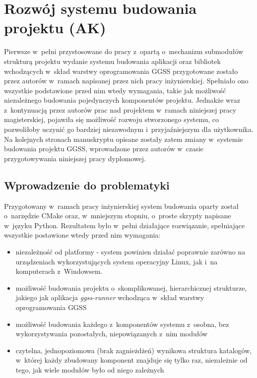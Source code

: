 \clearpage
\section{Rozwój systemu budowania projektu (AK)}
\label{ch:building_project}

Pierwsze w~pełni przystosowane do pracy z~opartą o~mechanizm submodułów strukturą projektu wydanie systemu budowania aplikacji oraz bibliotek wchodzących w~skład warstwy oprogramowania GGSS przygotowane zostało przez autorów w~ramach napisanej przez nich pracy inżynierskiej. Spełniało ono wszystkie podstawione przed nim wtedy wymagania, takie jak możliwość niezależnego budowania pojedynczych komponentów projektu. Jednakże wraz z~kontynuacją przez autorów prac nad projektem w~ramach niniejszej pracy magisterskiej, pojawiła się możliwość rozwoju stworzonego systemu, co pozwoliłoby uczynić go bardziej niezawodnym i~przyjaźniejszym dla użytkownika. Na kolejnych stronach manuskryptu opisane zostały zatem zmiany w~systemie budowania projektu GGSS, wprowadzone przez autorów w~czasie przygotowywania niniejszej pracy dyplomowej.

\subsection{Wprowadzenie do problematyki}
Przygotowany w~ramach pracy inżynierskiej system budowania oparty został o~narzędzie CMake oraz, w~mniejszym stopniu, o~proste skrypty napisane w~języku Python. Rezultatem było w~pełni działające rozwiązanie, spełniające wszystkie postawione wtedy przed nim wymagania:
\begin{itemize}
    \item niezależność od platformy - system powinien działać poprawnie zarówno na urządzeniach wykorzystujących system operacyjny Linux, jak i~na komputerach z~Windowsem.
    \item możliwość budowania projektu o~skomplikowanej, hierarchicznej strukturze, jakiego jak aplikacja \emph{ggss-runner} wchodząca w~skład warstwy oprogramowania GGSS 
    \item możliwość budowania każdego z~komponentów systemu z~osobna, bez wykorzystywania pozostałych, niepowiązanych z~nim modułów
    \item czytelna, jednopoziomowa (brak zagnieżdżeń) wynikowa struktura katalogów, w~której każdy zbudowany komponent znajduje się tylko raz, niezależnie od tego, jak wiele modułów było od niego zależnych
\end{itemize}

